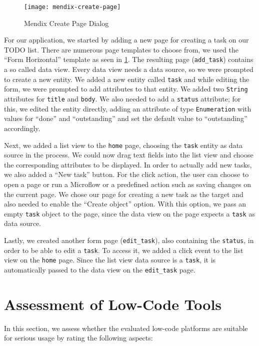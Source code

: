 \documentclass[runningheads]{llncs}
\begin{document}
\begin{figure}
  \centering
  \texttt{[image: mendix-create-page]}
  \caption{Mendix Create Page Dialog}
  \label{fig:mendix_create_page}
\end{figure}

For our application, we started by adding a new page for creating a task on our TODO list. There are numerous page templates to choose from, we used the “Form Horizontal” template as seen in \cref{fig:mendix_create_page}. The resulting page (\texttt{add\_task}) contains a so called data view. Every data view needs a data source, so we were prompted to create a new entity. We added a new entity called \texttt{task} and while editing the form, we were prompted to add attributes to that entity. We added two \texttt{String} attributes for \texttt{title} and \texttt{body}. We also needed to add a \texttt{status} attribute; for this, we edited the entity directly, adding an attribute of type \texttt{Enumeration} with values for “done” and “outstanding” and set the default value to “outstanding” accordingly.

Next, we added a list view to the \texttt{home} page, choosing the \texttt{task} entity as data source in the process. We could now drag text fields into the list view and choose the corresponding attributes to be displayed. In order to actually add new tasks, we also added a “New task” button. For the click action, the user can choose to open a page or run a Microflow or a predefined action such as saving changes on the current page. We chose our page for creating a new task as the target and also needed to enable the “Create object” option. With this option, we pass an empty \texttt{task} object to the page, since the data view on the page expects a \texttt{task} as data source.

Lastly, we created another form page (\texttt{edit\_task}), also containing the \texttt{status}, in order to be able to edit a \texttt{task}. To access it, we added a click event to the list view on the \texttt{home} page. Since the list view data source is a \texttt{task}, it is automatically passed to the data view on the \texttt{edit\_task} page.

\section{Assessment of Low-Code Tools}
\label{sec:assessment_of_tools}

In this section, we assess whether the evaluated low-code platforms are suitable for serious usage by rating the following aspects:
\end{document}
